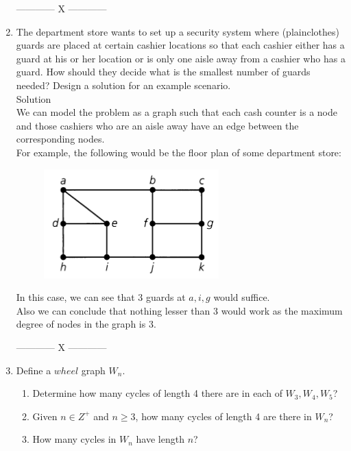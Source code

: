 \documentclass[a4paper]{article}
\begin{document}
\begin{enumerate}
\begin{center}
------------ X ------------
\end{center} 

\item The department store wants to set up a security system where
(plainclothes) guards are placed at certain cashier locations so
that each cashier either has a guard at his or her location or is
only one aisle away from a cashier who has a guard. How should they decide what is
the smallest number of guards needed? Design a solution for an example scenario.\\

Solution\\
We can model the problem as a graph such that each cash counter is a node and those cashiers who are an aisle away have an edge between the corresponding nodes.\\
For example, the following would be the floor plan of some department store:
\begin{figure}[h]
\centering
\includegraphics[scale=0.5]{dept.png}
\end{figure}
In this case, we can see that 3 guards at $a, i, g$ would suffice.\\
Also we can conclude that nothing lesser than 3 would work as the maximum degree of nodes in the graph is 3.\\

\begin{center}
------------ X ------------
\end{center} 

\item Define a $wheel$ graph $W_n$.
\begin{enumerate}
\item Determine how many cycles of length 4 there are in each of $W_3, W_4, W_5$?
\item Given $n \in Z^+$ and $n \geq 3$, how many
cycles of length 4 are there in $W_n$?
\item How many cycles in $W_n$ have length $n$?
\end{enumerate} 


\end{enumerate}
\end{document}
